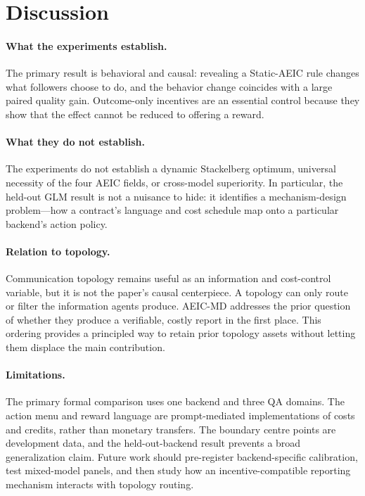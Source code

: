 \section{Discussion}
\label{sec:discussion}

\paragraph{What the experiments establish.} The primary result is behavioral and causal: revealing a Static-AEIC rule changes what followers choose to do, and the behavior change coincides with a large paired quality gain.  Outcome-only incentives are an essential control because they show that the effect cannot be reduced to offering a reward.

\paragraph{What they do not establish.} The experiments do not establish a dynamic Stackelberg optimum, universal necessity of the four AEIC fields, or cross-model superiority.  In particular, the held-out GLM result is not a nuisance to hide: it identifies a mechanism-design problem---how a contract's language and cost schedule map onto a particular backend's action policy.

\paragraph{Relation to topology.} Communication topology remains useful as an information and cost-control variable, but it is not the paper's causal centerpiece.  A topology can only route or filter the information agents produce.  AEIC-MD addresses the prior question of whether they produce a verifiable, costly report in the first place.  This ordering provides a principled way to retain prior topology assets without letting them displace the main contribution.

\paragraph{Limitations.} The primary formal comparison uses one backend and three QA domains.  The action menu and reward language are prompt-mediated implementations of costs and credits, rather than monetary transfers.  The boundary centre points are development data, and the held-out-backend result prevents a broad generalization claim.  Future work should pre-register backend-specific calibration, test mixed-model panels, and then study how an incentive-compatible reporting mechanism interacts with topology routing.

